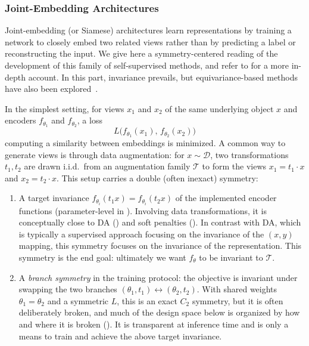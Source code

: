 \documentclass[mathematics,review,submit,moreauthors]{Definitions/mdpi}
\begin{document}
\subsubsection{Joint-Embedding Architectures}\label{sec:joint-embedding}

Joint-embedding (or Siamese) architectures learn representations by training a network to closely embed two related views rather than by predicting a label or reconstructing the input.
We give here a symmetry-centered reading of the development of this family of self-supervised methods, and refer to \citet{ilina2022sa} for a more in-depth account.
In this part, invariance prevails, but equivariance-based methods have also been explored~\citep{gupta2023a}.

In the simplest setting, for views $x_1$ and $x_2$ of the same underlying object $x$ and encoders $f_{\theta_1}$ and $f_{\theta_2}$, a loss 
\begin{equation}\label{eq:joint-embeddings}
    L\big(f_{\theta_1}(x_1),\,f_{\theta_2}(x_2)\big)
\end{equation}
computing a similarity between embeddings is minimized.
A common way to generate views is through data augmentation: for $x\sim\mathcal{D}$, two transformations $t_1,t_2$ are drawn i.i.d.\ from an augmentation family $\mathcal{T}$ to form the views $x_1=t_1\cdot x$ and $x_2=t_2\cdot x$.
This setup carries a double (often inexact) symmetry:
\begin{enumerate}
    \item A target invariance $f_{\theta_i}(t_1x)=f_{\theta_i}(t_2x)$ of the implemented encoder functions (parameter-level in ).
    Involving data transformations, it is conceptually close to DA () and soft penalties ().
    In contrast with DA, which is typically a supervised approach focusing on the invariance of the $(x,y)$ mapping, this symmetry focuses on the invariance of the representation.
    This symmetry is the end goal: ultimately we want $f_\theta$ to be invariant to $\mathcal{T}$.
    \item A \emph{branch symmetry} in the training protocol: the objective is invariant under swapping the two branches $(\theta_1,t_1)\leftrightarrow(\theta_2,t_2)$.
    With shared weights $\theta_1=\theta_2$ and a symmetric $L$, this is an exact $C_2$ symmetry, but it is often deliberately broken, and much of the design space below is organized by how and where it is broken ().
    It is transparent at inference time and is only a means to train and achieve the above target invariance.
\end{enumerate}
\end{document}
